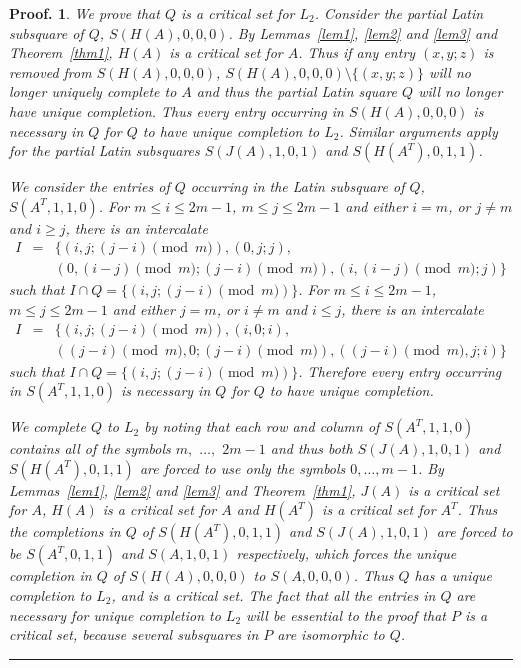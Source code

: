 \documentclass[12pt]{report}
\newtheorem{preproof}{{\bf Proof.}}
\newenvironment{proof}[1]{\begin{preproof}{\rm
               #1}\hfill{\rule[-0.5mm]{2mm}{2mm}}}{\end{preproof}}
\begin{document}
\begin{proof}
{We prove that $Q$ is a critical set for $L_2$.  Consider the partial Latin subsquare
of $Q$, $S(H(A),0,0,0)$.  By Lemmas~\ref{lem1}, \ref{lem2} and \ref{lem3}
and Theorem~\ref{thm1}, $H(A)$ is a critical set for $A$.  Thus if
any entry $(x,y;z)$ is removed from $S(H(A),0,0,0)$, $S(H(A),0,0,0) \setminus \{ (x,y;z)
\}$ will no longer uniquely complete to $A$ and thus the partial Latin
square $Q$ will no longer have unique completion.  
Thus every entry
occurring in $S(H(A),0,0,0)$ is necessary in $Q$ for $Q$ to have unique
completion to $L_2$.  Similar arguments apply for the partial Latin
subsquares $S(J(A),1,0,1)$ and $S(H(A^T),0,1,1)$.

We consider the entries of $Q$ occurring in the Latin subsquare of
$Q$, $S(A^T,1,1,0)$.  For $m \leq i \leq 2m-1$, $m \leq j \leq 2m-1$ and
either $i = m$, or $j \neq m$ and $i \geq j$, there is an intercalate 
\begin{eqnarray*}
I &=& \{ (i,j; (j-i) \pmod{m}), (0,j;j), \\
&&( 0, (i-j) \pmod{m}; (j-i) \pmod{m}), (i, (i-j) \pmod{m}; j) \}
\end{eqnarray*}
such that $I \cap Q = \{( i,j;(j-i) \pmod{m}) \}$.  For $m \leq i \leq 2m-1$, $m
\leq j \leq 2m-1$ and either $j = m$, or $i \neq m$ and $i \leq j$,
there is an intercalate 
\begin{eqnarray*}
I &=& \{ (i,j; (j-i) \pmod{m} ), (i,0;i), \\
&&( (j-i) \pmod{m}, 0; (j-i) \pmod{m}), ((j-i) \pmod{m}, j;  i) \}
\end{eqnarray*}
such that $I \cap Q = \{ (i, j; (j-i) \pmod{m}) \}$.
Therefore every entry occurring in $S(A^T,1,1,0)$ is necessary in $Q$
for $Q$ to have unique completion.

We complete $Q$ to $L_2$ by noting that each row and column of $S(A^T,1,1,0)$ 
contains all of the symbols
$m,$ $\dots,$ $2m-1$ and thus both $S(J(A),1,0,1)$ and $S(H(A^T),0,1,1)$
are forced to use only the symbols $0, \dots, m-1$.  By
Lemmas~\ref{lem1}, \ref{lem2} and \ref{lem3} and Theorem~\ref{thm1}, $J(A)$ 
is a critical set for $A$, $H(A)$ is a critical set for $A$ and 
$H(A^T)$ is a critical set for $A^T$.  
Thus the completions in $Q$ of $S(H(A^T),0,1,1)$
and $S(J(A),1,0,1)$ are forced to be $S(A^T,0,1,1)$ and $S(A,1,0,1)$ respectively,
which forces the unique completion in $Q$ of $S(H(A),0,0,0)$ to $S(A,0,0,0)$.
Thus $Q$ has a unique completion to $L_2$, and is a critical set.
The fact that all the entries in $Q$ are necessary for
unique completion to $L_2$ will be essential
to the proof that $P$ is a critical set, because several subsquares in $P$
are isomorphic to $Q$.

}
\end{proof}
\end{document}
